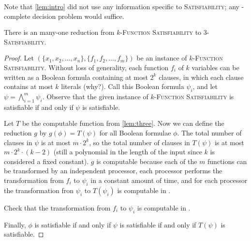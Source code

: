 \documentclass[]{article}
\begin{document}
Note that \autoref{lem:intro} did not use any information specific to \textsc{Satisfiability}; any \NP-complete decision problem would suffice.

\begin{lemma}\label{lem:decision}
  There is an \NC{} many-one reduction from \textsc{$k$-Function Satisfiability} to \textsc{3-Satisfiability}.
\end{lemma}
\begin{proof}
  Let $(\{x_1, x_2, \ldots, x_n\}, \{f_1, f_2, \ldots, f_m\})$ be an instance of \textsc{$k$-Function Satisfiability}.
  Without loss of generality, each function $f_i$ of $k$ variables can be written as a Boolean formula containing at most $2^k$ clauses, in which each clause contains at most $k$ literals (why?).
  Call this Boolean formula $\psi_i$, and let $\psi = \bigwedge_{i = 1}^m{\psi_i}$.
  Observe that the given instance of \textsc{$k$-Function Satisfiability} is satisfiable if and only if $\psi$ is satisfiable.

  Let $T$ be the \NC{} computable function from \autoref{lem:three}.
  Now we can define the reduction $g$ by $g(\phi) = T(\psi)$ for all Boolean formulae $\phi$.
  The total number of clauses in $\psi$ is at most $m \cdot 2 ^ k$, so the total number of clauses in $T(\psi)$ is at most $m \cdot 2^k \cdot (k - 2)$ (still a polynomial in the length of the input since $k$ is considered a fixed constant).
  $g$ is \NC{} computable because each of the $m$ functions can be transformed by an independent processor, each processor performs the transformation from $f_i$ to $\psi_i$ in a constant amount of time, and for each processor the transformation fron $\psi_i$ to $T(\psi_i)$ is computable in \NC.
  \begin{todo}
    Check that the transformation from $f_i$ to $\psi_i$ is computable in \NC.
  \end{todo}
  Finally, $\phi$ is satisfiable if and only if $\psi$ is satisfiable if and only if $T(\psi)$ is satisfiable.
\end{proof}
\end{document}

